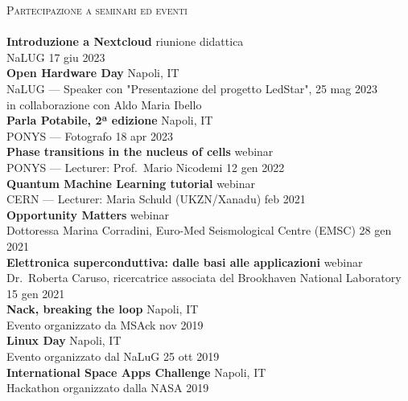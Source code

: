 \documentclass[a4paper]{article}
\newcommand{\lineunder} {
  \vspace*{-8pt} \\
  \hspace*{-18pt} \hrulefill \\
}
\newcommand{\header} [1] {
  {\hspace*{-18pt}\vspace*{6pt} \textsc{#1}}
  \vspace*{-6pt} \lineunder
}
\begin{document}
\header{Partecipazione a seminari ed eventi}
\textbf{Introduzione a Nextcloud} \hfill riunione didattica \\
NaLUG \hfill 17 giu 2023 \\
\vspace*{2mm}
\textbf{Open Hardware Day} \hfill Napoli, IT \\
NaLUG --- Speaker con "Presentazione del progetto LedStar", \hfill 25 mag 2023 \\
in collaborazione con Aldo Maria Ibello \\
\vspace*{2mm}
\textbf{Parla Potabile, 2ª edizione} \hfill Napoli, IT \\
PONYS --- Fotografo \hfill 18 apr 2023 \\
\vspace*{2mm}
\textbf{Phase transitions in the nucleus of cells} \hfill webinar \\
PONYS --- Lecturer: Prof.\ Mario Nicodemi \hfill 12 gen 2022\\
\vspace*{2mm}
\textbf{Quantum Machine Learning tutorial} \hfill webinar\\
CERN --- Lecturer: Maria Schuld (UKZN/Xanadu) \hfill feb 2021\\
\vspace*{2mm}
\textbf{Opportunity Matters} \hfill webinar \\
Dottoressa Marina Corradini,
Euro-Med Seismological Centre (EMSC)
\hfill 28 gen 2021 \\
\vspace*{2mm}
\textbf{Elettronica superconduttiva: dalle basi alle applicazioni}
\hfill webinar \\
Dr.\ Roberta Caruso, ricercatrice associata del Brookhaven National Laboratory
\hfill 15 gen 2021 \\
\vspace*{2mm}
\textbf{Nack, breaking the loop} \hfill Napoli, IT \\
Evento organizzato da MSAck \hfill nov 2019 \\
\vspace*{2mm}
\textbf{Linux Day} \hfill Napoli, IT \\
Evento organizzato dal NaLuG \hfill 25 ott 2019 \\
\vspace*{2mm}
\textbf{International Space Apps Challenge} \hfill Napoli, IT\\
Hackathon organizzato dalla NASA
\hfill 2019\\
\end{document}
